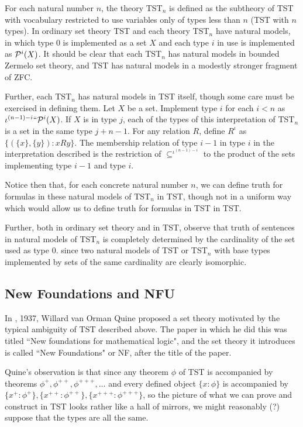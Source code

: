 \documentclass[112pt]{article}
\begin{document}
For each natural number $n$, the theory TST$_n$ is defined as the subtheory of TST with vocabulary restricted to use variables only of types less than $n$ (TST with $n$ types).
In ordinary set theory TST and each theory TST$_n$ have natural models, in which type 0 is implemented as a set $X$ and each type $i$ in use is implemented as ${\cal P}^i(X)$.  It should be clear that each TST$_n$ has natural models in bounded Zermelo set theory, and TST has natural models in a modestly stronger fragment of ZFC.

Further, each TST$_n$ has natural models in TST itself, though some care must be exercised in defining them.  Let $X$ be a set.  Implement type $i$ for each $i<n$ as
$\iota^{(n-1)-i}``{\cal P}^i(X)$.  If $X$ is in type $j$, each of the types of this interpretation of TST$_n$ is a set in the same type $j+n-1$.  For any relation $R$, define
$R^{\iota}$ as $\{(\{x\},\{y\}):x R y\}$.  The membership relation of type $i-1$ in type $i$ in the interpretation described is the restriction of $\subseteq^{\iota^{(n-1)-i}}$ to
the product of the sets implementing type $i-1$ and type $i$.

Notice then that, for each concrete natural number $n$, we can define truth for formulas in these natural models of TST$_n$  in TST, though not in a uniform way which would allow us to define truth for formulas
in TST in TST.

Further, both in ordinary set theory and in TST, observe that truth of sentences in natural models of TST$_n$ is completely determined by the cardinality of the set used as type 0.
since two natural models of TST or TST$_n$ with base types implemented by sets of the same cardinality are clearly isomorphic. 

\newpage

\subsection{New Foundations and NFU}

In \cite{nf}, 1937, Willard van Orman Quine proposed a set theory motivated by the typical ambiguity of TST described above.  The paper in which he did this was titled ``New foundations for mathematical logic", and the set theory it introduces is called ``New Foundations" or NF, after the title of the paper.

Quine's observation is that since any theorem $\phi$ of TST is accompanied by theorems $\phi^+, \phi^{++}, \phi^{+++}, \ldots$ and every defined object $\{x:\phi\}$ is accompanied by
$\{x^+:\phi^+\},\{x^{++}:\phi^{++}\},\{x^{+++}:\phi^{+++}\}$, so the picture of what we can prove and construct in TST looks rather like a hall of mirrors, we might reasonably (?) suppose that the types are all the same.
\end{document}
